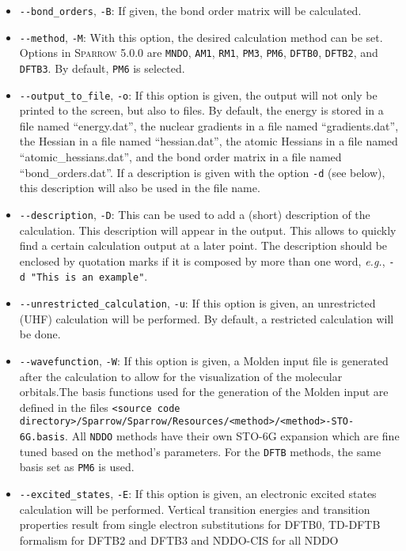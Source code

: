 \documentclass[]{tufte-book}
\begin{document}
\begin{itemize}
\item \texttt{-{}-bond\_orders}, \texttt{-B}: If given, the bond order matrix will be calculated.
\item \texttt{-{}-method}, \texttt{-M}: With this option, the desired calculation method can be set. Options in
\textsc{Sparrow} 5.0.0 are \texttt{MNDO}, \texttt{AM1}, \texttt{RM1}, \texttt{PM3}, \texttt{PM6}, \texttt{DFTB0}, \texttt{DFTB2}, and
\texttt{DFTB3}. By default, \texttt{PM6} is selected.
\item \texttt{-{}-output\_to\_file}, \texttt{-o}: If this option is given, the output will not only be printed to the screen, 
but also to files. By default, the energy is stored in a file named ``energy.dat'', the nuclear gradients in a file named
``gradients.dat'', the Hessian in a file named ``hessian.dat'', the atomic Hessians in a file named ``atomic\_hessians.dat'', and the
bond order matrix in a file named ``bond\_orders.dat''.
If a description is given with the option \texttt{-d} (see below), this description will also be used in the file name.
\item \texttt{-{}-description}, \texttt{-D}: This can be used to add a (short) description of the calculation. This
description will appear in the output. This allows to quickly find a certain calculation output at a later point. The
description should be enclosed by quotation marks if it is composed by more than one word, \textit{e.g.},
\texttt{-d "This is an example"}.
\item \texttt{-{}-unrestricted\_calculation}, \texttt{-u}: If this option is given, an unrestricted (UHF) calculation
will be performed. By default, a restricted calculation will be done.
\item \texttt{-{}-wavefunction}, \texttt{-W}: If this option is given, a Molden input file is generated after the
calculation to allow for the visualization of the molecular orbitals.The basis functions used for the generation of the
Molden input are defined in the files \texttt{<source code directory>/Sparrow/Sparrow/Resources/<method>/<method>-STO-6G.basis}.
All \texttt{NDDO} methods have their own STO-6G expansion which are fine tuned based on the method's parameters.
For the \texttt{DFTB} methods, the same basis set as \texttt{PM6} is used.
\item \texttt{-{}-excited\_states}, \texttt{-E}: If this option is given, an
  electronic excited states calculation will be performed. Vertical transition
    energies and transition properties result from single electron substitutions
    for DFTB0, TD-DFTB formalism for DFTB2 and DFTB3 and NDDO-CIS for all NDDO

\end{itemize}
\end{document}
